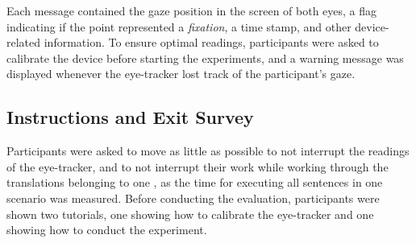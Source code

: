 Each message contained the gaze position in the screen of both eyes, a flag indicating if the point represented a \emph{fixation}, a time stamp, and other device-related information. 
%
To ensure optimal readings, participants were asked to calibrate the \eye device before starting the experiments, and a warning message was displayed whenever the eye-tracker lost track of the participant's gaze.




\subsection{Instructions and Exit Survey}


%

%
%
Participants were asked to move as little as possible to not interrupt the readings of the eye-tracker, 
%
%
%
%
and to not interrupt their work while working through the translations belonging to one \gamet, as the time for executing all sentences in one scenario was measured. 
Before conducting the evaluation, participants were shown two tutorials, one showing how to calibrate the eye-tracker and one showing how to conduct the experiment. 

